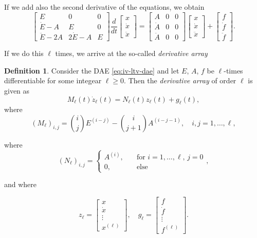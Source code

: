 \documentclass[]{book}
\theoremstyle{definition}
\newtheorem{definition}{Definition}[chapter]
\theoremstyle{definition}
\theoremstyle{definition}
\theoremstyle{definition}
\theoremstyle{remark}
\begin{document}
If we add also the second derivative of the equations, we obtain
\[
\begin{bmatrix}
E & 0 & 0\\
\dot E - A & E &0  \\
\ddot E - 2A & 2\dot E -A &E 
\end{bmatrix}
\frac{d}{dt}
\begin{bmatrix}
x \\ \dot x \\ \ddot x
\end{bmatrix} =
\begin{bmatrix}
A & 0 & 0\\
\dot A & 0 & 0\\
\ddot A & 0  & 0
\end{bmatrix}
\begin{bmatrix}
x \\ \dot x \\ \ddot x
\end{bmatrix}
+
\begin{bmatrix}
f \\ \dot f \\ \ddot f
\end{bmatrix}.
\]

If we do this \(\ell\) times, we arrive at the so-called \emph{derivative array}
\begin{definition}
\protect\hypertarget{def:iv-derivative-array}{}{\label{def:iv-derivative-array} }Consider the DAE \eqref{eq:iv-ltv-dae} and let \(E\), \(A\), \(f\) be \(\ell\)-times differentiable for some integear \(\ell\geq 0\). Then the \emph{derivative array} of order \(\ell\) is given as
\begin{equation}
M_\ell (t) \dot z_\ell(t) = N_\ell (t) z_\ell(t) + g_\ell(t),
\end{equation}
where
\[
(M_\ell)_{i,j} = \binom{i}{j}E^{(i-j)} - \binom{i}{j+1}A^{(i-j-1)}, \quad i,j=1,\dotsc,\ell,
\]

where
\[
(N_\ell)_{i,j} = 
\begin{cases}
A^{(i)}, \quad &\text{for } i=1,\dotsc, \ell, \, j=0 \\
0, \quad & \text{else}
\end{cases},
\]

and where

\[
z_\ell = \begin{bmatrix}
x \\ \dot x \\ \vdots \\ x^{(\ell)}
\end{bmatrix}, \quad
g_\ell = \begin{bmatrix}
f \\ \dot f \\ \vdots \\ f^{(\ell)}
\end{bmatrix}.
\]
\end{definition}
\end{document}
